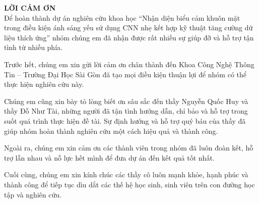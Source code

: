 
{\LARGE \textbf{LỜI CẢM ƠN}} \\[1cm]

Để hoàn thành dự án nghiên cứu khoa học “Nhận diện biểu cảm khuôn mặt trong điều kiện ánh sáng yếu sử dụng CNN nhẹ kết hợp kỹ thuật tăng cường dữ liệu thích ứng” nhóm chúng em đã nhận được rất nhiều sự giúp đỡ và hỗ trợ tận tình từ nhiều phía.

Trước hết, chúng em xin gửi lời cảm ơn chân thành đến Khoa Công Nghệ Thông Tin – Trường Đại Học Sài Gòn đã tạo mọi điều kiện thuận lợi để nhóm có thể thực hiện nghiên cứu này.

Chúng em cũng xin bày tỏ lòng biết ơn sâu sắc đến thầy Nguyễn Quốc Huy và thầy Đỗ Như Tài, những người đã tận tình hướng dẫn, chỉ bảo và hỗ trợ trong suốt quá trình thực hiện đề tài. Sự định hướng và hỗ trợ quý báu của thầy đã giúp nhóm hoàn thành nghiên cứu một cách hiệu quả và thành công.

Ngoài ra, chúng em xin cảm ơn các thành viên trong nhóm đã luôn đoàn kết, hỗ trợ lẫn nhau và nỗ lực hết mình để đưa dự án đến kết quả tốt nhất.

Cuối cùng, chúng em xin kính chúc các thầy cô luôn mạnh khỏe, hạnh phúc và thành công để tiếp tục dìu dắt các thế hệ học sinh, sinh viên trên con đường học tập và nghiên cứu.